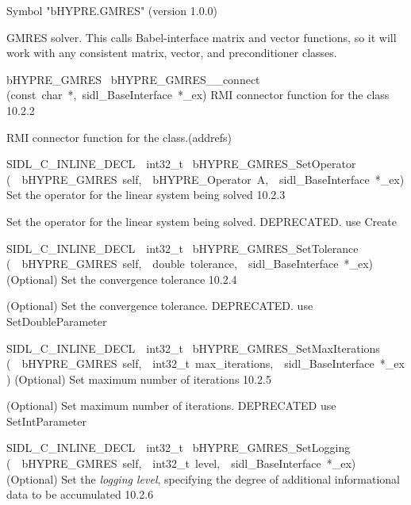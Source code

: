 \documentclass{article}
\begin{document}
\begin{cxxentry}
\begin{cxxentry}
\begin{cxxvariable}
\begin{cxxdoc}
Symbol "bHYPRE.GMRES" (version 1.0.0)

GMRES solver.
This calls Babel-interface matrix and vector functions, so it will work
with any consistent matrix, vector, and preconditioner classes.
\end{cxxdoc}
\end{cxxvariable}
\begin{cxxfunction}
{bHYPRE\_GMRES\ }
        {bHYPRE\_GMRES\_\_connect}
        {(const\ char\ *,\ sidl\_BaseInterface\ *\_ex)}
        {
RMI connector function for the class}
        {10.2.2}
\begin{cxxdoc}

RMI connector function for the class.(addrefs)
\end{cxxdoc}
\end{cxxfunction}
\begin{cxxfunction}
{SIDL\_C\_INLINE\_DECL\ \ int32\_t\ }
        {bHYPRE\_GMRES\_SetOperator}
        {(\ \ bHYPRE\_GMRES\ self,\ \ bHYPRE\_Operator\ A,\ \ sidl\_BaseInterface\ *\_ex)}
        {
Set the operator for the linear system being solved}
        {10.2.3}
\begin{cxxdoc}

Set the operator for the linear system being solved.
DEPRECATED.  use Create
\end{cxxdoc}
\end{cxxfunction}
\begin{cxxfunction}
{SIDL\_C\_INLINE\_DECL\ \ int32\_t\ }
        {bHYPRE\_GMRES\_SetTolerance}
        {(\ \ bHYPRE\_GMRES\ self,\ \ double\ tolerance,\ \ sidl\_BaseInterface\ *\_ex)}
        {
(Optional) Set the convergence tolerance}
        {10.2.4}
\begin{cxxdoc}

(Optional) Set the convergence tolerance.
DEPRECATED.  use SetDoubleParameter
\end{cxxdoc}
\end{cxxfunction}
\begin{cxxfunction}
{SIDL\_C\_INLINE\_DECL\ \ int32\_t\ }
        {bHYPRE\_GMRES\_SetMaxIterations}
        {(\ \ bHYPRE\_GMRES\ self,\ \ int32\_t\ max\_iterations,\ \ sidl\_BaseInterface\ *\_ex)}
        {
(Optional) Set maximum number of iterations}
        {10.2.5}
\begin{cxxdoc}

(Optional) Set maximum number of iterations.
DEPRECATED   use SetIntParameter
\end{cxxdoc}
\end{cxxfunction}
\begin{cxxfunction}
{SIDL\_C\_INLINE\_DECL\ \ int32\_t\ }
        {bHYPRE\_GMRES\_SetLogging}
        {(\ \ bHYPRE\_GMRES\ self,\ \ int32\_t\ level,\ \ sidl\_BaseInterface\ *\_ex)}
        {
(Optional) Set the {\it logging level}, specifying the degree
of additional informational data to be accumulated}
        {10.2.6}
\begin{cxxdoc}


\end{cxxdoc}
\end{cxxfunction}
\end{cxxentry}
\end{cxxentry}
\end{document}
